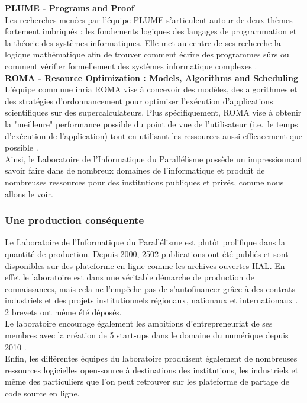 \textbf{PLUME - Programs and Proof}\\
Les recherches menées par l'équipe PLUME s'articulent autour de deux thèmes fortement imbriqués : les fondements logiques des langages de programmation et la théorie des systèmes informatiques. Elle met au centre de ses recherche la logique mathématique afin de trouver comment écrire des programmes sûrs ou comment vérifier formellement des systèmes informatique complexes \cite{plume}.\\

\textbf{ROMA - Resource Optimization : Models, Algorithms and Scheduling}
L'équipe commune \gls{inria} ROMA vise à concevoir des modèles, des algorithmes et des stratégies d'ordonnancement pour optimiser l'exécution d'applications scientifiques sur des supercalculateurs. Plus spécifiquement, ROMA vise à obtenir la "meilleure" performance possible du point de vue de l'utilisateur (i.e.\ le temps d'exécution de l'application) tout en utilisant les ressources aussi efficacement que possible \cite{roma}.\\

Ainsi, le Laboratoire de l'Informatique du Parallélisme possède un impressionnant savoir faire dans de nombreux domaines de l'informatique et produit de nombreuses ressources pour des institutions publiques et privés, comme nous allons le voir.

\subsubsection{Une production conséquente}
Le Laboratoire de l'Informatique du Parallélisme est plutôt prolifique dans la quantité de production. Depuis 2000, 2502 publications ont été publiés et sont disponibles sur des plateforme en ligne comme les archives ouvertes HAL. En effet le laboratoire est dans une véritable démarche de production de connaissances, mais cela ne l'empêche pas de s'autofinancer grâce à des contrats industriels et des projets institutionnels régionaux, nationaux et internationaux \cite{reportHCERES}. 2 brevets ont même été déposés.\\

Le laboratoire encourage également les ambitions d'entrepreneuriat de ses membres avec la création de 5 start-ups dans le domaine du numérique depuis 2010 \cite{presUCBL}.\\

Enfin, les différentes équipes du laboratoire produisent également de nombreuses ressources logicielles open-source à destinations des institutions, les industriels et même des particuliers que l'on peut retrouver sur les plateforme de partage de code source en ligne.
